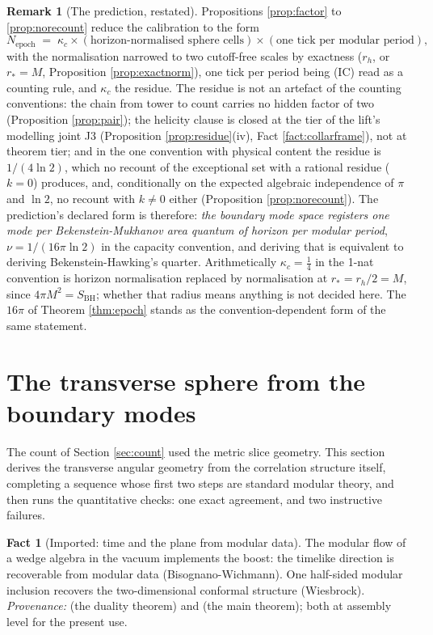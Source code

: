 \documentclass[11pt]{article}
\theoremstyle{definition}
\newtheorem{remark}[theorem]{Remark}
\newtheorem{fact}[theorem]{Fact}
\newcommand{\SBH}{S_{\mathrm{BH}}}
\begin{document}
\begin{remark}[The prediction, restated]\label{rem:betrestated}
Propositions \ref{prop:factor} to \ref{prop:norecount} reduce the calibration to the form
\[
N_{\mathrm{epoch}} \;=\; \kappa_c \times (\text{horizon-normalised sphere cells}) \times (\text{one tick per modular period}),
\]
with the normalisation narrowed to two cutoff-free scales by exactness ($r_h$, or $r_* = M$, Proposition \ref{prop:exactnorm}), one tick per period being (IC) read as a counting rule, and $\kappa_c$ the residue. The residue is not an artefact of the counting conventions: the chain from tower to count carries no hidden factor of two (Proposition \ref{prop:pair}); the helicity clause is closed at the tier of the lift's modelling joint J3 (Proposition \ref{prop:residue}(iv), Fact \ref{fact:collarframe}), not at theorem tier; and in the one convention with physical content the residue is $1/(4\ln 2)$, which no recount of the exceptional set with a rational residue ($k = 0$) produces, and, conditionally on the expected algebraic independence of $\pi$ and $\ln 2$, no recount with $k \neq 0$ either (Proposition \ref{prop:norecount}). The prediction's declared form is therefore: \emph{the boundary mode space registers one mode per Bekenstein-Mukhanov area quantum of horizon per modular period}, $\nu = 1/(16\pi\ln 2)$ in the capacity convention, and deriving that is equivalent to deriving Bekenstein-Hawking's quarter. Arithmetically $\kappa_c = \tfrac14$ in the 1-nat convention is horizon normalisation replaced by normalisation at $r_* = r_h/2 = M$, since $4\pi M^2 = \SBH$; whether that radius means anything is not decided here. The $16\pi$ of Theorem \ref{thm:epoch} stands as the convention-dependent form of the same statement.
\end{remark}

\section{The transverse sphere from the boundary modes}\label{sec:sphere}

The count of Section \ref{sec:count} used the metric slice geometry. This section derives the transverse angular geometry from the correlation structure itself, completing a sequence whose first two steps are standard modular theory, and then runs the quantitative checks: one exact agreement, and two instructive failures.

\begin{fact}[Imported: time and the plane from modular data]\label{fact:modular2d}
The modular flow of a wedge algebra in the vacuum implements the boost: the timelike direction is recoverable from modular data (Bisognano-Wichmann). One half-sided modular inclusion recovers the two-dimensional conformal structure (Wiesbrock). \emph{Provenance:} \cite{BisognanoWichmann1976} (the duality theorem) and \cite{Wiesbrock1993} (the main theorem); both at assembly level for the present use.
\end{fact}
\end{document}

